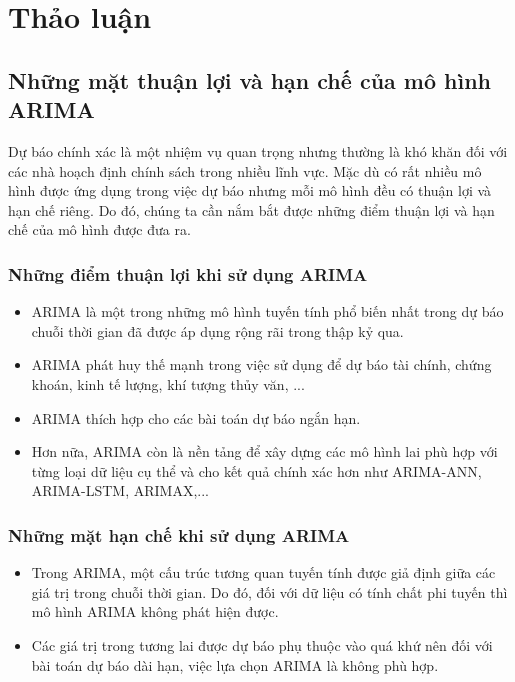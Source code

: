 \documentclass[12pt, a4paper,oneside]{book}
\theoremstyle{definition}
\begin{document}
\chapter*{Thảo luận}
\section*{Những mặt thuận lợi và hạn chế của mô hình ARIMA}
Dự báo chính xác là một nhiệm vụ quan trọng nhưng thường là khó khăn đối với các nhà hoạch định chính sách trong nhiều lĩnh vực. Mặc dù có rất nhiều mô hình được ứng dụng trong việc dự báo nhưng mỗi mô hình đều có thuận lợi và hạn chế riêng. Do đó, chúng ta cần nắm bắt được những điểm thuận lợi và hạn chế của mô hình được đưa ra.
\subsection*{Những điểm thuận lợi khi sử dụng ARIMA}
\begin{itemize}
	\item ARIMA là một trong những mô hình tuyến tính phổ biến nhất trong dự báo chuỗi thời gian đã được áp dụng rộng rãi trong thập kỷ qua.
	\item ARIMA phát huy thế mạnh trong việc sử dụng để dự báo tài chính, chứng khoán, kinh tế lượng, khí tượng thủy văn, ...
	\item ARIMA thích hợp cho các bài toán dự báo ngắn hạn.
	\item Hơn nữa, ARIMA còn là nền tảng để xây dựng các mô hình lai phù hợp với từng loại dữ liệu cụ thể và cho kết quả chính xác hơn như ARIMA-ANN, ARIMA-LSTM, ARIMAX,...
\end{itemize}
\subsection*{Những mặt hạn chế khi sử dụng ARIMA}
\begin{itemize}
	\item Trong ARIMA, một cấu trúc tương quan tuyến tính được giả định giữa các giá trị trong chuỗi thời gian. Do đó, đối với dữ liệu có tính chất phi tuyến thì mô hình ARIMA không phát hiện được. 
	\item Các giá trị trong tương lai được dự báo phụ thuộc vào quá khứ nên đối với bài toán dự báo dài hạn, việc lựa chọn ARIMA là không phù hợp.
\end{itemize}
\end{document}
